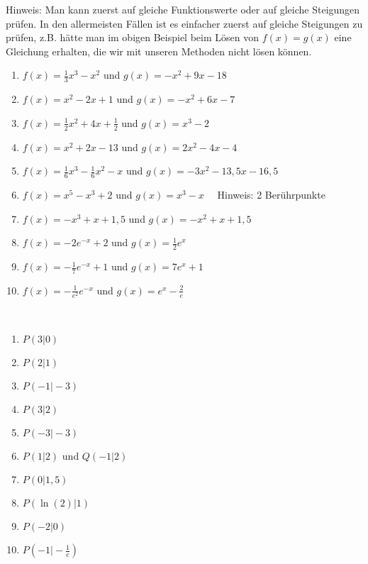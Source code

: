 \textcolor{loes}{Hinweis: Man kann zuerst auf gleiche Funktionswerte oder auf gleiche Steigungen prüfen. In den allermeisten Fällen ist es einfacher zuerst auf gleiche Steigungen zu prüfen, z.B. hätte man im obigen Beispiel beim Lösen von \(f(x)=g(x)\) eine Gleichung erhalten, die wir mit unseren Methoden nicht lösen können.}\newpage
\begin{Exercise}[title={\raggedright Bestimme jeweils den Berührpunkt der beiden Funktionen.}, label=beruehrpunkteA1]
	\begin{enumerate}[label=\alph*)]
		\item \(f(x)=\frac{1}{3}x^3-x^2\) und \(g(x)=-x^2+9x-18\)
		\item \(f(x)=x^2-2x+1\) und \(g(x)=-x^2+6x-7\)
		\item \(f(x)=\frac{1}{2}x^2+4x+\frac{1}{2}\) und \(g(x)=x^3-2\)
		\item \(f(x)=x^2+2x-13\) und \(g(x)=2x^2-4x-4\)
		\item \(f(x)=\frac{1}{6}x^3-\frac{1}{6}x^2-x\) und \(g(x)=-3x^2-13,5x-16,5\)
		\item \(f(x)=x^5-x^3+2\) und \(g(x)=x^3-x\quad\) Hinweis: 2 Berührpunkte
		\item \(f(x)=-x^3+x+1,5\) und \(g(x)=-x^2+x+1,5\)
		\item \(f(x)=-2e^{-x}+2\) und \(g(x)=\frac{1}{2}e^x\)
		\item \(f(x)=-\frac{1}{7}e^{-x}+1\) und \(g(x)=7e^x+1\)
		\item \(f(x)=-\frac{1}{e^2}e^{-x}\) und \(g(x)=e^x-\frac{2}{e}\)
	\end{enumerate}
\end{Exercise}
\begin{Answer}[ref=beruehrpunkteA1]\\
	\begin{enumerate}[label=\alph*)]
		\item \(P(3\vert0)\)
		\item \(P(2\vert1)\)
		\item \(P(-1\vert-3)\)
		\item \(P(3\vert2)\)
		\item \(P(-3\vert-3)\)
		\item \(P(1\vert2)\) und \(Q(-1\vert2)\)
		\item \(P(0\vert1,5)\)
		\item \(P(\ln(2)\vert1)\)
		\item \(P(-2\vert0)\)
		\item \(P\left(-1\vert-\frac{1}{e}\right)\)
	\end{enumerate}
\end{Answer}